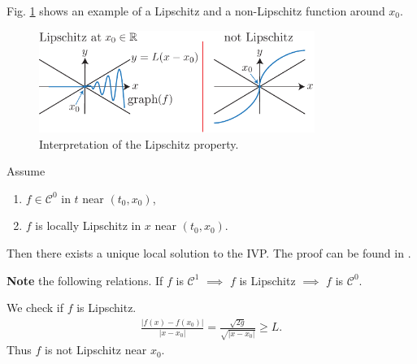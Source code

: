 \begin{ex}
	Fig. \ref{fig:Lipschitz_ex} shows an example of a Lipschitz and a non-Lipschitz function around $x_0$.
	\begin{figure}[h!]
		\centering
		\includegraphics[width=0.8\textwidth]{figures/ch1/2lipschitz.pdf}
		\caption{Interpretation of the Lipschitz property.}
		\label{fig:Lipschitz_ex}
	\end{figure}
\end{ex}

\begin{theorem}[Picard]
	Assume 
	\begin{enumerate}
		\item  $f \in \mathcal{C}^0$ in $t$ near $(t_0,  {x}_0)$,
		\item $f$ is locally Lipschitz in $ {x}$ near $(t_0,  {x}_0)$.
	\end{enumerate}
	Then there exists a unique local solution to the IVP. The proof can be found in \cite{Arnold}. 	
\end{theorem}
\textbf{Note} the following relations. If $f$ is $\mathcal{C}^1$ $\implies$ $f $ is Lipschitz $\implies $ $f$ is $\mathcal{C}^0$.
\begin{ex}
	We check if $f$ is Lipschitz.
	\begin{align}
		\frac{ | f(x) - f(x_0)  |}{ |x-x_0 |} = \frac{\sqrt{2g}}{\sqrt{ |x-x_0 |}} \geq  L.
	\end{align}
Thus $f$ is not Lipschitz near $x_0$.	
\end{ex}

